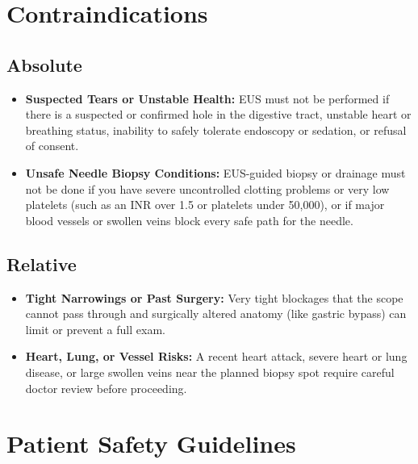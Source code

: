 \section{Contraindications}

\subsection{Absolute}

\begin{itemize}
    \item \textbf{Suspected Tears or Unstable Health:} EUS must not be performed if there is a suspected or confirmed hole in the digestive tract, unstable heart or breathing status, inability to safely tolerate endoscopy or sedation, or refusal of consent.
    \item \textbf{Unsafe Needle Biopsy Conditions:} EUS-guided biopsy or drainage must not be done if you have severe uncontrolled clotting problems or very low platelets (such as an INR over 1.5 or platelets under 50,000), or if major blood vessels or swollen veins block every safe path for the needle.
\end{itemize}

\subsection{Relative}

\begin{itemize}
    \item \textbf{Tight Narrowings or Past Surgery:} Very tight blockages that the scope cannot pass through and surgically altered anatomy (like gastric bypass) can limit or prevent a full exam.
    \item \textbf{Heart, Lung, or Vessel Risks:} A recent heart attack, severe heart or lung disease, or large swollen veins near the planned biopsy spot require careful doctor review before proceeding.
\end{itemize}

\section{Patient Safety Guidelines}

